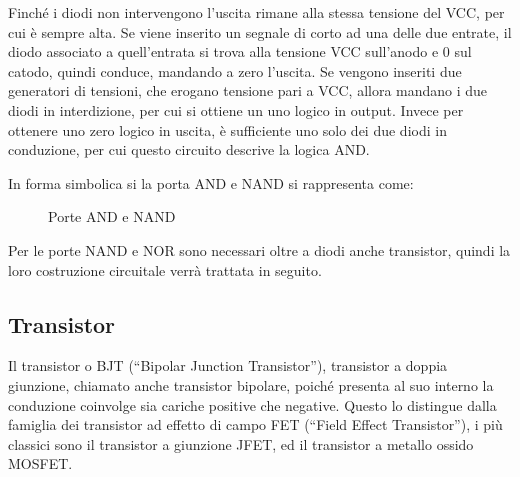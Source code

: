 \documentclass{article}
\numberwithin{equation}{subsection}
\begin{document}
Finché i diodi non intervengono l'uscita rimane alla stessa tensione del VCC, per cui è sempre alta. 
Se viene inserito un segnale di corto ad una delle due entrate, il diodo associato a quell'entrata si trova alla tensione VCC sull'anodo e $0$ sul 
catodo, quindi conduce, mandando a zero l'uscita. Se vengono inseriti due generatori di tensioni, che erogano tensione pari a VCC, allora mandano i 
due diodi in interdizione, per cui si ottiene un uno logico in output. Invece per ottenere uno zero logico in uscita, è sufficiente uno solo dei due diodi in conduzione, per cui 
questo circuito descrive la logica AND. 


In forma simbolica si la porta AND e NAND si rappresenta come: 
\begin{figure}[H]%
    \centering
    \qquad
    \caption{Porte AND e NAND}
    \label{fig:porte-and-nand}
\end{figure}


Per le porte NAND e NOR sono necessari oltre a diodi anche transistor, quindi la loro costruzione circuitale verrà trattata in seguito. 

\subsection{Transistor}

Il transistor o BJT (``Bipolar Junction Transistor''), transistor a doppia giunzione, chiamato anche transistor bipolare, poiché presenta al suo interno la conduzione 
coinvolge sia cariche positive che negative. Questo lo distingue dalla famiglia dei transistor ad effetto di campo FET (``Field Effect Transistor''), i più classici sono 
il transistor a giunzione JFET, ed il transistor a metallo ossido MOSFET. 
\end{document}
